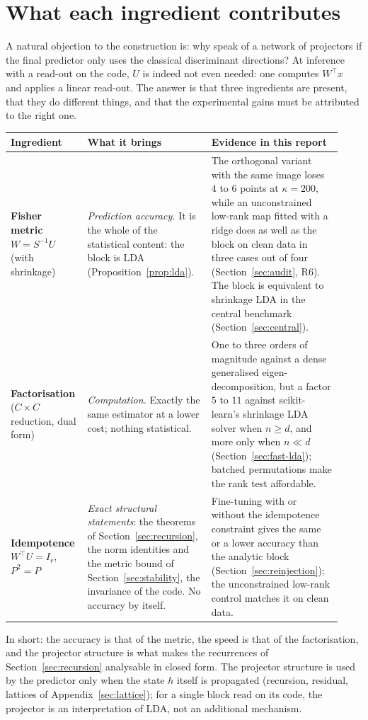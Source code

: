 \documentclass[11pt,a4paper]{article}
\theoremstyle{plain}
\theoremstyle{definition}
\theoremstyle{remark}
\newcommand{\T}{\top}
\begin{document}
\section{What each ingredient contributes}
\label{sec:ingredients}
A natural objection to the construction is: why speak of a network of
projectors if the final predictor only uses the classical discriminant
directions? At inference with a read-out on the code, $U$ is indeed not
even needed: one computes $W^\T x$ and applies a linear read-out. The
answer is that three ingredients are present, that they do different
things, and that the experimental gains must be attributed to the right
one.
\begin{center}\small\renewcommand{\arraystretch}{1.2}
\begin{tabular}{@{}p{0.19\linewidth}p{0.36\linewidth}p{0.38\linewidth}@{}}
\toprule
\textbf{Ingredient} & \textbf{What it brings} & \textbf{Evidence in this report} \\
\midrule
\textbf{Fisher metric} $W=S^{-1}U$ (with shrinkage) &
\emph{Prediction accuracy.} It is the whole of the statistical content: the
block is LDA (Proposition~\ref{prop:lda}). &
The orthogonal variant with the same image loses $4$ to $6$ points at
$\kappa=200$, while an unconstrained low-rank map fitted with a ridge does
as well as the block on clean data in three cases out of four
(Section~\ref{sec:audit}, R6). The
block is equivalent to shrinkage LDA in the central benchmark
(Section~\ref{sec:central}). \\
\textbf{Factorisation} ($C\times C$ reduction, dual form) &
\emph{Computation.} Exactly the same estimator at a lower cost; nothing
statistical. &
One to three orders of magnitude against a dense generalised
eigen-decomposition, but a factor $5$ to $11$ against scikit-learn's
shrinkage LDA solver when $n\ge d$, and more only when $n\ll d$
(Section~\ref{sec:fast-lda}); batched permutations make the rank test
affordable. \\
\textbf{Idempotence} $W^\T U=I_r$, $P^2=P$ &
\emph{Exact structural statements}: the theorems of
Section~\ref{sec:recursion}, the norm identities and the metric bound of
Section~\ref{sec:stability}, the invariance of the code. No accuracy by
itself. &
Fine-tuning with or without the idempotence constraint gives the same or a
lower accuracy than the analytic block (Section~\ref{sec:reinjection});
the unconstrained low-rank control matches it on clean data. \\
\bottomrule
\end{tabular}
\end{center}
In short: the accuracy is that of the metric, the speed is that of the
factorisation, and the projector structure is what makes the recurrences of
Section~\ref{sec:recursion} analysable in closed form. The projector
structure is used by the predictor only when the state $h$ itself is
propagated (recursion, residual, lattices of Appendix~\ref{sec:lattice});
for a single block read on its code, the projector is an interpretation of
LDA, not an additional mechanism.
\end{document}
